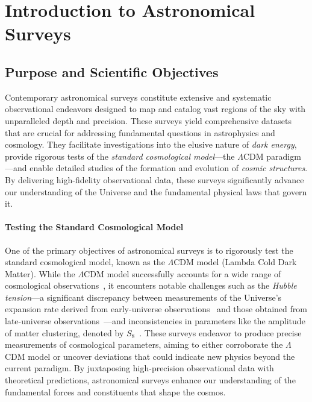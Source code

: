 \section{Introduction to Astronomical Surveys}

\subsection{Purpose and Scientific Objectives}
Contemporary astronomical surveys constitute extensive and systematic observational endeavors designed to map and catalog vast regions of the sky with unparalleled depth and precision. These surveys yield comprehensive datasets that are crucial for addressing fundamental questions in astrophysics and cosmology. They facilitate investigations into the elusive nature of \emph{dark energy}, provide rigorous tests of the \emph{standard cosmological model}—the $\Lambda$CDM paradigm—and enable detailed studies of the formation and evolution of \emph{cosmic structures}. By delivering high-fidelity observational data, these surveys significantly advance our understanding of the Universe and the fundamental physical laws that govern it.

\paragraph{Testing the Standard Cosmological Model}
One of the primary objectives of astronomical surveys is to rigorously test the standard cosmological model, known as the $\Lambda$CDM model (Lambda Cold Dark Matter). While the $\Lambda$CDM model successfully accounts for a wide range of cosmological observations~\cite{Planck2018}, it encounters notable challenges such as the \emph{Hubble tension}—a significant discrepancy between measurements of the Universe's expansion rate derived from early-universe observations~\cite{Planck2018} and those obtained from late-universe observations~\cite{Riess2019}—and inconsistencies in parameters like the amplitude of matter clustering, denoted by $S_8$~\cite{Heymans2021}. These surveys endeavor to produce precise measurements of cosmological parameters, aiming to either corroborate the $\Lambda$CDM model or uncover deviations that could indicate new physics beyond the current paradigm. By juxtaposing high-precision observational data with theoretical predictions, astronomical surveys enhance our understanding of the fundamental forces and constituents that shape the cosmos.

